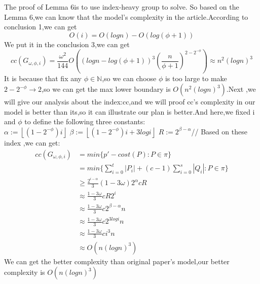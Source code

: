 \documentclass[a4paper, oneside]{article}
\begin{document}
The proof of Lemma 6is to use index-heavy group to solve. So based on the Lemma 6,we can know that the model's complexity in the article\cite{corrigan2015balloon2}.According to conclusion 1,we can get
\begin{equation}
  O(i)=O(logn)-O(log(\phi+1))
\end{equation}
We put it in the conclusion 3,we can get
\begin{equation}
  cc(G_{\omega,\phi,i})=\frac{{\omega}^2}{144}O((logn-log(\phi+1))^3{(\frac{n}{\phi+1})^{2-2^{-\phi}}})\approx n^2(logn)^3
\end{equation}
It is because that fix any $\phi\in \mathbb N$,so we can choose $\phi$ is too large to make $2-2^{-\phi}\to 2$,so we can get the max lower boundary is $O(n^2(logn)^3)$.Next ,we will give our analysis about the index:cc,and we will proof cc's complexity in our model is better than its,so it can illustrate our plan is better.And here,we fixed i and $\phi$ to define the following three constants:\\
$\alpha :=\left\lfloor (1-2^{-\phi})i\right\rfloor$
$\beta :=\left\lfloor (1-2^{-\phi})i+3logi\right\rfloor$
$R:=2^{\beta-\alpha}$//
Based on these index ,we can get:
\begin{equation}
\begin{aligned}
  cc(G_{\omega,\phi,i})&=min\{p'-cost(P):P \in \pi \}\\
  &=min\{\sum\limits_{i=0}^t|P_i|+(c-1)\sum\limits_{i=0}^s|Q_i|:P \in \pi \}\\
  &\ge\frac{2^{i-\alpha}}{3} (1-3\omega)2^{\alpha} cR \\
  &\approx \frac{1-3\omega}{3} cR2^i\\
  &\approx \frac{1-3\omega}{3} c 2^{\beta-\alpha} n \\
  &\approx \frac{1-3\omega}{3} c 2^{3logi} n \\
  &\approx \frac{1-3\omega}{3} c i^3 n \\
  &\approx O(n(logn)^3)
\end{aligned}
\end{equation}
We can get the better complexity than original paper's model,our better complexity is $O(n(logn)^3)$



\end{document}
